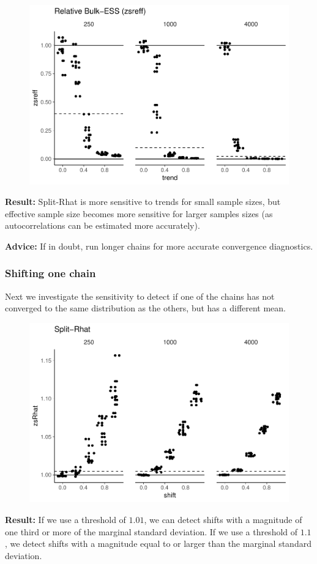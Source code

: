 \documentclass[american,]{article}
\begin{document}
\begin{figure}[t]
  \centering
  \includegraphics[width=0.6\linewidth]{graphics/zsreff-same-trend-1.pdf}
\end{figure}

\textbf{Result:} Split-Rhat is more sensitive to trends for small sample
sizes, but effective sample size becomes more sensitive for larger
samples sizes (as autocorrelations can be estimated more accurately).

\textbf{Advice:} If in doubt, run longer chains for more accurate
convergence diagnostics.

\hypertarget{shifting-one-chain}{%
\subsubsection*{Shifting one chain}\label{shifting-one-chain}}

Next we investigate the sensitivity to detect if one of the chains has
not converged to the same distribution as the others, but has a
different mean.

\begin{figure}[t]
  \centering
  \includegraphics[width=0.6\linewidth]{graphics/zsrhat-shifted-chain-1.pdf}
\end{figure}

\textbf{Result:} If we use a threshold of \(1.01\), we can detect shifts
with a magnitude of one third or more of the marginal standard
deviation. If we use a threshold of \(1.1\), we detect shifts with a
magnitude equal to or larger than the marginal standard deviation.
\end{document}
